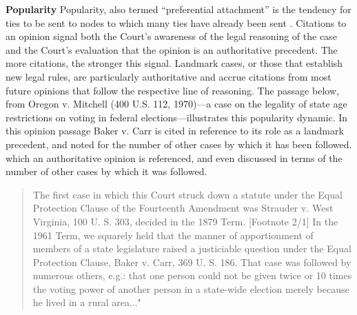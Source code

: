 \documentclass[headsepline=true, abstracton]{scrartcl}
\begin{document}
\noindent \textbf{Popularity} Popularity, also termed ``preferential attachment'' is the tendency for ties to be sent to nodes to which many ties have already been sent \citep{barabasi1999emergence}. Citations to an opinion signal both the Court's awareness of the legal reasoning of the case and the Court's evaluation that the opinion is an authoritative precedent. The more citations, the stronger this signal. Landmark cases, or those that establish new legal rules, are particularly authoritative and accrue citations from most future opinions that follow the respective line of reasoning. The passage below, from Oregon v. Mitchell (400 U.S. 112, 1970)---a case on the legality of state age restrictions on voting in federal elections---illustrates this popularity dynamic. In this opinion passage Baker v. Carr is cited in reference to its role as a landmark precedent, and noted for the number of other cases by which it has been followed.  which an authoritative opinion is referenced, and even discussed in terms of the number of other cases by which it was followed. 
\begin{quotation}
The first case in which this Court struck down a statute under the Equal Protection Clause of the Fourteenth Amendment was Strauder v. West Virginia, 100 U. S. 303, decided in the 1879 Term. [Footnote 2/1] In the 1961 Term, we squarely held that the manner of apportionment of members of a state legislature raised a justiciable question under the Equal Protection Clause, Baker v. Carr, 369 U. S. 186. That case was followed by numerous others, e.g.: that one person could not be given twice or 10 times the voting power of another person in a state-wide election merely because he lived in a rural area..."
\end{quotation} %
\end{document}
